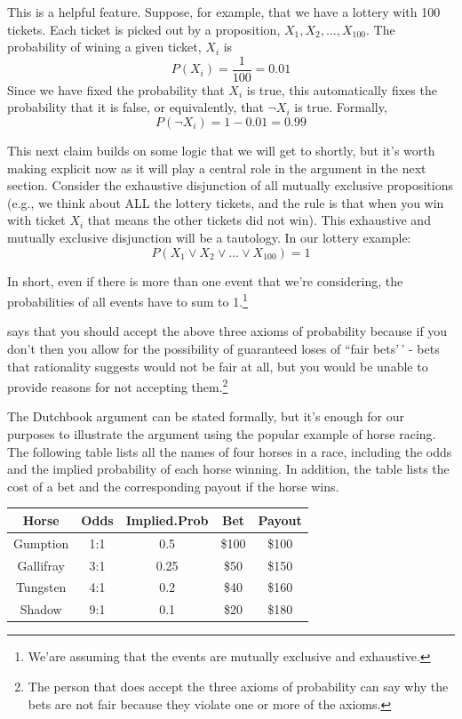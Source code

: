 \documentclass[]{tufte-book}
\begin{document}
This is a helpful feature. Suppose, for example, that we have a lottery with 100 tickets. Each ticket is picked out by a proposition, \(X_1, X_2, \ldots, X_{100}\). The probability of wining a given ticket, \(X_i\) is
\[
P(X_i)=\frac{1}{100}=0.01
\]
Since we have fixed the probability that \(X_i\) is true, this automatically fixes the probability that it is false, or equivalently, that \(\neg X_i\) is true. Formally,
\[
P(\neg X_i) = 1-0.01 = 0.99
\]

This next claim builds on some logic that we will get to shortly, but it's worth making explicit now as it will play a central role in the argument in the next section. Consider the exhaustive disjunction of all mutually exclusive propositions (e.g., we think about ALL the lottery tickets, and the rule is that when you win with ticket \(X_i\) that means the other tickets did not win). This exhaustive and mutually exclusive disjunction will be a tautology. In our lottery example:
\[
P(X_1 \vee X_2 \vee \ldots \vee X_{100}) = 1
\]

In short, even if there is more than one event that we're considering, the probabilities of all events have to sum to 1.\footnote{We'are assuming that the events are mutually exclusive and exhaustive.}

 says that you should accept the above three axioms of probability because if you don't then you allow for the possibility of guaranteed loses of ``fair bets'\,' - bets that rationality suggests would not be fair at all, but you would be unable to provide reasons for not accepting them.\footnote{The person that does accept the three axioms of probability can say why the bets are not fair because they violate one or more of the axioms.}

The Dutchbook argument can be stated formally, but it's enough for our purposes to illustrate the argument using the popular example of horse racing. The following table lists all the names of four horses in a race, including the odds and the implied probability of each horse winning. In addition, the table lists the cost of a bet and the corresponding payout if the horse wins.

\begin{longtable}[]{@{}ccccc@{}}
\toprule
Horse & Odds & Implied.Prob & Bet & Payout\tabularnewline
\midrule
\endhead
Gumption & 1:1 & 0.5 & \$100 & \$100\tabularnewline
Gallifray & 3:1 & 0.25 & \$50 & \$150\tabularnewline
Tungsten & 4:1 & 0.2 & \$40 & \$160\tabularnewline
Shadow & 9:1 & 0.1 & \$20 & \$180\tabularnewline
\bottomrule
\end{longtable}
\end{document}
